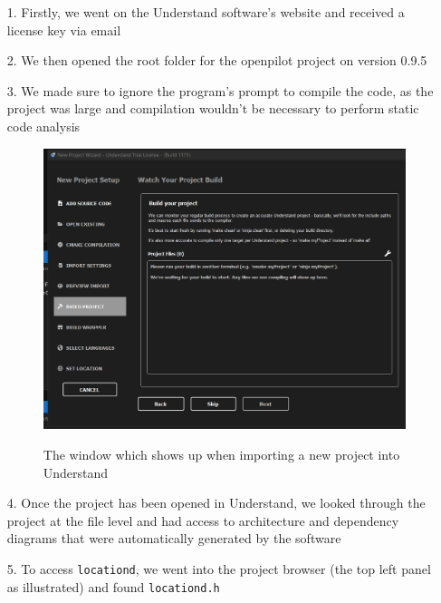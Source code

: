 \documentclass[12pt]{article}
\begin{document}
\begin{itemize}
    \item[1.] Firstly, we went on the Understand software's website and received a license key via email
    \item[2.] We then opened the root folder for the openpilot project on version 0.9.5
    \item[3.] We made sure to ignore the program's prompt to compile the code, as the project was large and compilation wouldn't be necessary to perform static code analysis
    \begin{figure}[H]
        \centering
        \includegraphics[scale=0.3]{importing.jpg}\\
        \caption{The window which shows up when importing a new project into Understand}
        \label{fig:enter-label}
    \end{figure}
    
    \item[4.] Once the project has been opened in Understand, we looked through the project at the file level and had access to architecture and dependency diagrams that were automatically generated by the software
    \item[5.] To access \texttt{locationd}, we went into the project browser (the top left panel as illustrated) and found \texttt{locationd.h}


\end{itemize}
\end{document}
